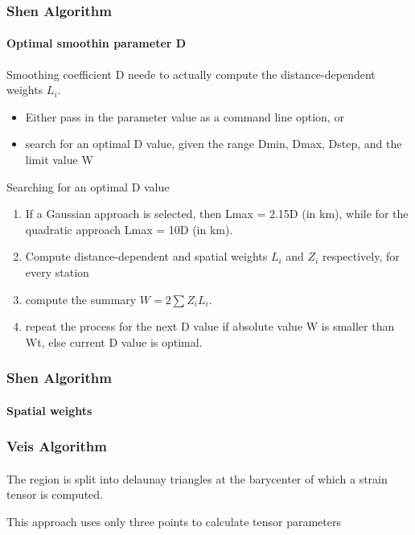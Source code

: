 \begin{frame}
  \frametitle{Shen Algorithm}
  \framesubtitle{Optimal smoothin parameter D}
  \label{ch2:}
 
  Smoothing coefficient D neede to actually compute the distance-dependent weights  $L_{i}$.
 
  \begin{itemize}
    \item Either pass in the parameter value as a command line option, or
    \item search for an optimal D value, given the range Dmin, Dmax, Dstep, and the limit value W
  \end{itemize}
  
  Searching for an optimal D value
  
  \begin{enumerate}
    \item If a Gaussian approach is selected, then Lmax = 2.15D (in km), while for the quadratic approach Lmax = 10D (in km).
    \item Compute distance-dependent and spatial weights $ L_{i} $ and $ Z_{i} $ respectively, for every station
    \item compute the summary $ W = 2\sum Z_{i} L_{i} $.
    \item repeat the process for the next D value if absolute value W is smaller than Wt, else current D value is optimal.
  \end{enumerate}
 
 

\end{frame}
\note{}

\begin{frame}
  \frametitle{Shen Algorithm}
  \framesubtitle{Spatial weights}
  \label{ch2:}
  
\end{frame}
\note{}

\begin{frame}
  \frametitle{Veis Algorithm}
  \framesubtitle{}
  \label{ch2:}
  
  The region is split into delaunay triangles at the barycenter of which a strain tensor is computed.
  
  This approach uses only three points to calculate tensor parameters
 
\end{frame}
\note{}

